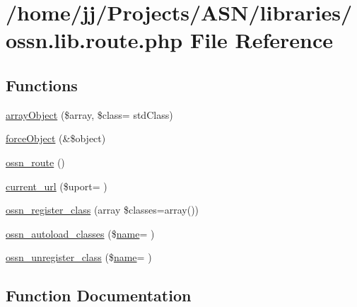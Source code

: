 \hypertarget{ossn_8lib_8route_8php}{}\section{/home/jj/\+Projects/\+A\+S\+N/libraries/ossn.lib.\+route.\+php File Reference}
\label{ossn_8lib_8route_8php}
\subsection*{Functions}
\begin{DoxyCompactItemize}
\item 
\hyperlink{ossn_8lib_8route_8php_a79ce899ce98ad90b10fee0b598e1bd5a}{array\+Object} (\$array, \$class= \textquotesingle{}std\+Class\textquotesingle{})
\item 
\hyperlink{ossn_8lib_8route_8php_aca09e0f582473a9b1c19c4fd180a44ce}{force\+Object} (\&\$object)
\item 
\hyperlink{ossn_8lib_8route_8php_ac23dc424aa33dcd57982b72f4ed1217e}{ossn\+\_\+route} ()
\item 
\hyperlink{ossn_8lib_8route_8php_ae60b2619e462f20751f6938019d8edd4}{current\+\_\+url} (\$uport= \textquotesingle{}\textquotesingle{})
\item 
\hyperlink{ossn_8lib_8route_8php_ac43c6e99759542a01766293beb6b364d}{ossn\+\_\+register\+\_\+class} (array \$classes=array())
\item 
\hyperlink{ossn_8lib_8route_8php_acdf3dd6cb81c5603579dd711f8292a64}{ossn\+\_\+autoload\+\_\+classes} (\$\hyperlink{user_8php_a765af5e9671743530143a6d3670fd9a6}{name}= \textquotesingle{}\textquotesingle{})
\item 
\hyperlink{ossn_8lib_8route_8php_a7a8e15d80d1e72bf6aff8fbf156eb8c2}{ossn\+\_\+unregister\+\_\+class} (\$\hyperlink{user_8php_a765af5e9671743530143a6d3670fd9a6}{name}= \textquotesingle{}\textquotesingle{})
\end{DoxyCompactItemize}


\subsection{Function Documentation}
